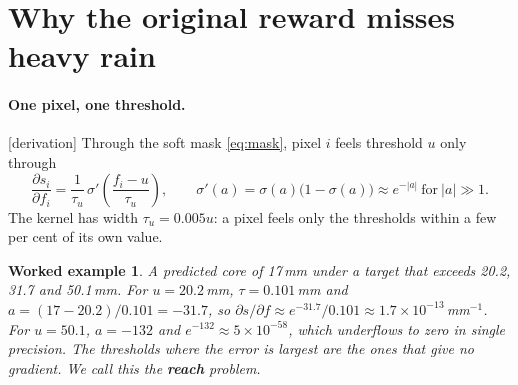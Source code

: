 \documentclass[11pt,a4paper]{article}
\newcommand{\status}[1]{\textsf{\small[#1]}}
\newtheorem*{example}{Worked example}
\begin{document}
\section{Why the original reward misses heavy rain}\label{sec:heavy}

\paragraph{One pixel, one threshold.} \status{derivation} Through the soft mask \eqref{eq:mask}, pixel $i$ feels
threshold $u$ only through
\begin{equation}\label{eq:sens}
  \frac{\partial s_i}{\partial f_i} = \frac{1}{\tau_u}\,\sigma'\!\left(\frac{f_i-u}{\tau_u}\right),\qquad
  \sigma'(a) = \sigma(a)\big(1-\sigma(a)\big)\approx e^{-|a|}\ \text{for}\ |a|\gg 1 .
\end{equation}
The kernel has width $\tau_u = 0.005u$: a pixel feels only the thresholds within a few per cent of its own value.

\begin{example}
A predicted core of 17\,mm under a target that exceeds 20.2, 31.7 and 50.1\,mm. For $u = 20.2$\,mm, $\tau = 0.101$\,mm and
$a = (17-20.2)/0.101 = -31.7$, so $\partial s/\partial f \approx e^{-31.7}/0.101 \approx 1.7\times10^{-13}$\,mm$^{-1}$.
For $u = 50.1$, $a = -132$ and $e^{-132}\approx 5\times10^{-58}$, which underflows to zero in single precision. The
thresholds where the error is largest are the ones that give no gradient. We call this the \textbf{reach} problem.
\end{example}
\end{document}
